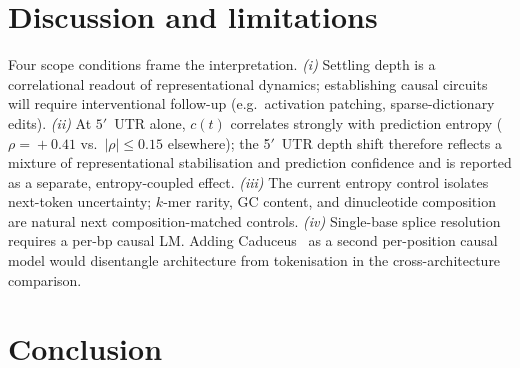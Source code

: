 \documentclass{article}
\theoremstyle{plain}
\theoremstyle{definition}
\theoremstyle{remark}
\begin{document}
\begin{table}[t]
\caption{Cross-model summary. Full per-window numbers and MLM tokenisation caveats are in App.~\ref{app:cross-arch}.}
\label{tab:cross-arch-summary}
\centering
\footnotesize
\setlength{\tabcolsep}{4pt}
\end{table}


\section{Discussion and limitations}
\label{sec:discussion}

Four scope conditions frame the interpretation. \emph{(i)} Settling depth is a correlational readout of representational dynamics; establishing causal circuits will require interventional follow-up (e.g.\ activation patching, sparse-dictionary edits). \emph{(ii)} At $5'$~UTR alone, $c(t)$ correlates strongly with prediction entropy ($\rho\!=\!+0.41$ vs.\ $|\rho|\!\le\!0.15$ elsewhere); the 5$'$~UTR depth shift therefore reflects a mixture of representational stabilisation and prediction confidence and is reported as a separate, entropy-coupled effect. \emph{(iii)} The current entropy control isolates next-token uncertainty; $k$-mer rarity, GC content, and dinucleotide composition are natural next composition-matched controls. \emph{(iv)} Single-base splice resolution requires a per-bp causal LM. Adding Caduceus~\cite{schiff2024caduceus} as a second per-position causal model would disentangle architecture from tokenisation in the cross-architecture comparison.


\section{Conclusion}
\label{sec:conclusion}
\end{document}
